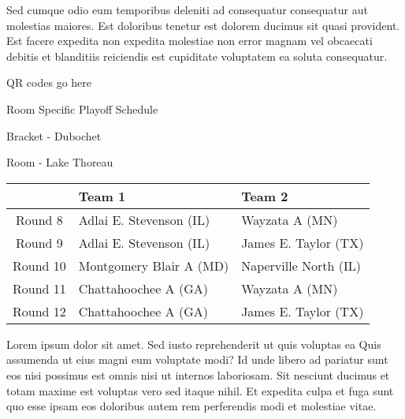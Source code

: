 \documentclass{article}%
\begin{document}
\newline%
Sed cumque odio eum temporibus deleniti ad consequatur consequatur aut molestias maiores. Est doloribus tenetur est dolorem ducimus sit quasi provident. Est facere expedita non expedita molestiae non error magnam vel obcaecati debitis et blanditiis reiciendis est cupiditate voluptatem ea soluta consequatur.%
\vspace*{140pt}%
\begin{center}%
\begin{Huge}%
QR codes go here%
\end{Huge}%
\end{center}%
\newpage%
\begin{center}%
\begin{Huge}%
Room Specific Playoff Schedule%
\end{Huge}%
\vspace*{8pt}%
\linebreak%
\begin{Large}%
Bracket {-} Dubochet%
\end{Large}%
\vspace*{8pt}%
\linebreak%
\vspace*{8pt}%
\begin{Large}%
Room {-} Lake Thoreau%
\end{Large}%
\end{center}%
%
\begin{tabularx}{\textwidth}{|c|Y|Y|}%
\hline%
&Team 1&Team 2\\%
\hline%
Round 8&Adlai E. Stevenson (IL)&Wayzata A (MN)\\%
Round 9&Adlai E. Stevenson (IL)&James E. Taylor (TX)\\%
Round 10&Montgomery Blair A (MD)&Naperville North (IL)\\%
Round 11&Chattahoochee A (GA)&Wayzata A (MN)\\%
Round 12&Chattahoochee A (GA)&James E. Taylor (TX)\\%
\hline%
\end{tabularx}%
\vspace*{8pt}%
\newline%
Lorem ipsum dolor sit amet. Sed iusto reprehenderit ut quis voluptas ea Quis assumenda ut eius magni eum voluptate modi? Id unde libero ad pariatur sunt eos nisi possimus est omnis nisi ut internos laboriosam. Sit nesciunt ducimus et totam maxime est voluptas vero sed itaque nihil. Et expedita culpa et fuga sunt quo esse ipsam eos doloribus autem rem perferendis modi et molestiae vitae.\newline%
\end{document}
